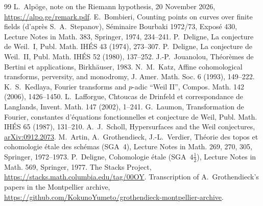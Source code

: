 \documentclass[11pt,a4paper]{article}
\theoremstyle{plain}
\theoremstyle{remark}
\begin{document}
\begin{thebibliography}{99}
 L.~Alp\"oge, note on the Riemann hypothesis, 20 November 2026, \url{https://alpo.ge/remark.pdf}.
 E.~Bombieri, Counting points on curves over finite fields (d'apr\`es S.~A.~Stepanov), S\'eminaire
Bourbaki 1972/73, Expos\'e 430, Lecture Notes in Math. 383, Springer, 1974, 234--241.
 P.~Deligne, La conjecture de Weil.~I, Publ. Math. IH\'ES 43 (1974), 273--307.
 P.~Deligne, La conjecture de Weil.~II, Publ. Math. IH\'ES 52 (1980), 137--252.
 J.-P.~Jouanolou, Th\'eor\`emes de Bertini et applications, Birkh\"auser, 1983.
 N.~M.~Katz, Affine cohomological transforms, perversity, and monodromy, J. Amer. Math. Soc. 6
(1993), 149--222.
 K.~S.~Kedlaya, Fourier transforms and $p$-adic ``Weil II'', Compos. Math. 142 (2006), 1426--1450.
 L.~Lafforgue, Chtoucas de Drinfeld et correspondance de Langlands, Invent. Math. 147 (2002),
1--241.
 G.~Laumon, Transformation de Fourier, constantes d'\'equations fonctionnelles et conjecture de
Weil, Publ. Math. IH\'ES 65 (1987), 131--210.
 A.~J.~Scholl, Hypersurfaces and the Weil conjectures,
\href{https://arxiv.org/abs/0912.2073}{arXiv:0912.2073}.
 M.~Artin, A.~Grothendieck, J.-L.~Verdier, Th\'eorie des topos et cohomologie \'etale des sch\'emas
(SGA~4), Lecture Notes in Math. 269, 270, 305, Springer, 1972--1973.
 P.~Deligne, Cohomologie \'etale (SGA~$4\frac12$), Lecture Notes in Math. 569, Springer, 1977.
 The Stacks Project, \url{https://stacks.math.columbia.edu/tag/00OY}.
 Transcription of A.~Grothendieck's papers in the Montpellier archive,
\url{https://github.com/KokunoYumeto/grothendieck-montpellier-archive}.
\end{thebibliography}
\end{document}
